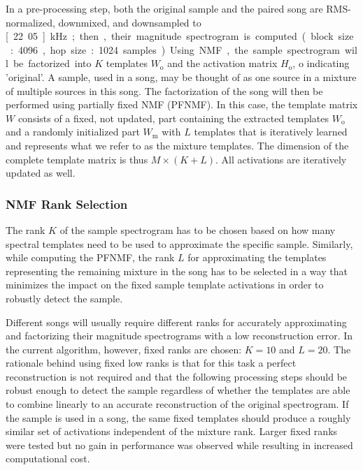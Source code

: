 \documentclass{article}
\begin{document}
In a pre-processing step, both the original sample and the paired song are RMS-normalized, downmixed, and downsampled to \unit[22.05]{kHz}; then, their magnitude spectrogram is computed (block size: 4096, hop size: 1024 samples). %
Using NMF, the sample spectrogram will be factorized into $K$ templates $W_\mathrm{o}$ and the activation matrix $H_\mathrm{o}$, $\mathrm{o}$ indicating 'original'. A sample, used in a song, may be thought of as one source in a mixture of multiple sources in this song. 
The factorization of the song will then be performed using partially fixed NMF (PFNMF)\cite{wu_drum_2015,wu2015drum}. In this case, the template matrix $W$ consists of a fixed, not updated, part containing the extracted templates $W_\mathrm{o}$ and a randomly initialized part $W_\mathrm{m}$ with $L$ templates that is iteratively learned and represents what we refer to as the mixture templates. The dimension of the complete template matrix is thus $M\times (K+L)$. All activations are iteratively updated as well.

\subsubsection{NMF Rank Selection}
\label{nmfrank}
The rank $K$ of the sample spectrogram has to be chosen based on how many spectral templates need to be used to approximate the specific sample. Similarly, while computing the PFNMF, the rank $L$ for approximating the templates representing the remaining mixture in the song has to be selected in a way that minimizes the impact on the fixed sample template activations in order to robustly detect the sample.

Different songs will usually require different ranks for accurately approximating and factorizing their magnitude spectrograms with a low reconstruction error. In the current algorithm, however, fixed ranks are chosen: $K=10$ and $L=20$. The rationale behind using fixed low ranks is that for this task a perfect reconstruction is not required and that the following processing steps should be robust enough to detect the sample regardless of whether the templates are able to combine linearly to an accurate reconstruction of  the original spectrogram. If the sample is used in a song, the same fixed templates should produce a roughly similar set of activations independent of the mixture rank. Larger fixed ranks were tested but no gain in performance was observed while resulting in increased computational cost.
\end{document}
